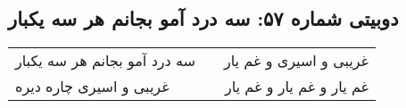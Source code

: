 \begin{center}
\section*{دوبیتی شماره ۵۷: سه درد آمو بجانم هر سه یکبار}
\label{sec:057}
\begin{longtable}{l p{0.5cm} r}
سه درد آمو بجانم هر سه یکبار
&&
غریبی و اسیری و غم یار
\\
غریبی و اسیری چاره دیره
&&
غم یار و غم یار و غم یار
\\
\end{longtable}
\end{center}
